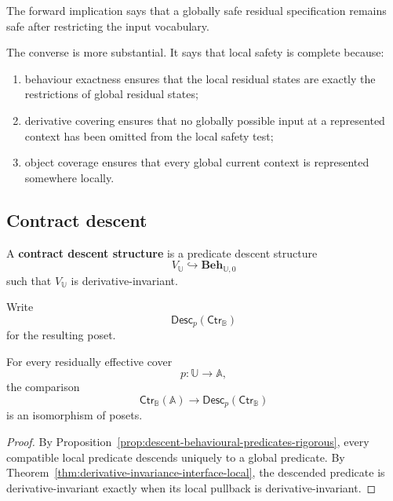 \begin{remark}
\label{rem:interface-local-safety-interpretation}
The forward implication says that a globally safe residual specification
remains safe after restricting the input vocabulary.

The converse is more substantial. It says that local safety is complete
because:
\begin{enumerate}
    \item behaviour exactness ensures that the local residual states are
    exactly the restrictions of global residual states;
    \item derivative covering ensures that no globally possible input at a
    represented context has been omitted from the local safety test;
    \item object coverage ensures that every global current context is
    represented somewhere locally.
\end{enumerate}
\end{remark}

\subsection{Contract descent}
\label{subsec:contract-descent-rigorous}

\begin{definition}
\label{def:contract-descent-datum-rigorous}
A \textbf{contract descent structure} is a predicate descent structure
\[
    V_{\mathbb U}
    \hookrightarrow
    \mathbf{Beh}_{\mathbb U,0}
\]
such that \(V_{\mathbb U}\) is derivative-invariant.
\end{definition}

Write
\[
    \mathsf{Desc}_p
    \left(
        \mathsf{Ctr}_{\mathbb B}
    \right)
\]
for the resulting poset.

\begin{theorem}
\label{thm:effective-descent-residual-contracts}
For every residually effective cover
\[
    p:\mathbb U\to\mathbb A,
\]
the comparison
\[
    \mathsf{Ctr}_{\mathbb B}(\mathbb A)
    \longrightarrow
    \mathsf{Desc}_p
    \left(
        \mathsf{Ctr}_{\mathbb B}
    \right)
\]
is an isomorphism of posets.
\end{theorem}

\begin{proof}
By
Proposition~\ref{prop:descent-behavioural-predicates-rigorous},
every compatible local predicate descends uniquely to a global predicate.
By
Theorem~\ref{thm:derivative-invariance-interface-local},
the descended predicate is derivative-invariant exactly when its local
pullback is derivative-invariant.
\end{proof}

